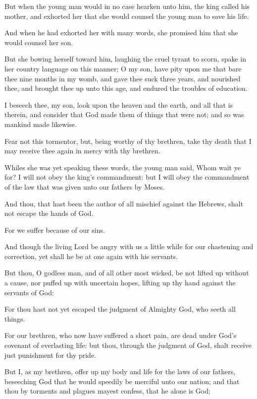 {\par }{\PP {}But when the young man would in no case hearken unto him, the king called his mother, and exhorted her that she would counsel the young man to save his life.
\par }{\PP {}And when he had exhorted her with many words, she promised him that she would counsel her son.
\par }{\PP {}But she bowing herself toward him, laughing the cruel tyrant to scorn, spake in her country language on this manner; O my son, have pity upon me that bare thee nine months in my womb, and gave thee suck three years, and nourished thee, and brought thee up unto this age, and endured the troubles of education.
\par }{\PP {}I beseech thee, my son, look upon the heaven and the earth, and all that is therein, and consider that God made them of things that were not; and so was mankind made likewise.
\par }{\PP {}Fear not this tormentor, but, being worthy of thy brethren, take thy death that I may receive thee again in mercy with thy brethren.
\par }{\PP {}Whiles she was yet speaking these words, the young man said, Whom wait ye for? I will not obey the king’s commandment: but I will obey the commandment of the law that was given unto our fathers by Moses.
\par }{\PP {}And thou, that hast been the author of all mischief against the Hebrews, shalt not escape the hands of God.
\par }{\PP {}For we suffer because of our sins.
\par }{\PP {}And though the living Lord be angry with us a little while for our chastening and correction, yet shall he be at one again with his servants.
\par }{\PP {}But thou, O godless man, and of all other most wicked, be not lifted up without a cause, nor puffed up with uncertain hopes, lifting up thy hand against the servants of God:
\par }{\PP {}For thou hast not yet escaped the judgment of Almighty God, who seeth all things.
\par }{\PP {}For our brethren, who now have suffered a short pain, are dead under God’s covenant of everlasting life: but thou, through the judgment of God, shalt receive just punishment for thy pride.
\par }{\PP {}But I, as my brethren, offer up my body and life for the laws of our fathers, beseeching God that he would speedily be merciful unto our nation; and that thou by torments and plagues mayest confess, that he alone is God;
}
